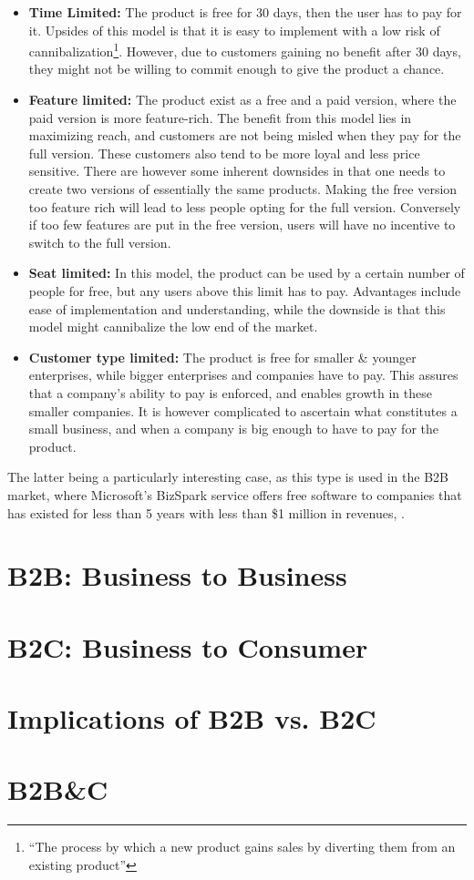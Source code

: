 \begin{itemize}
\item \textbf{Time Limited: }The product is free for 30 days, then the user has to pay for it. Upsides of this model is that it is easy to implement with a low risk of cannibalization\footnote{ “The process by which a new product
gains sales by diverting them from an existing product”\cite{heskettj1976}}. However, due to customers gaining no benefit after 30 days, they might not be willing to commit enough to give the product a chance.
\item \textbf{Feature limited: }The product exist as a free and a paid version, where the paid version is more feature-rich. The benefit from this model lies in maximizing reach, and customers are not being misled when they pay for the full version. These customers also tend to be more loyal and less price sensitive. There are however some inherent downsides in that one needs to create two versions of essentially the same products. Making the free version too feature rich will lead to less people opting for the full version. Conversely if too few features are put in the free version, users will have no incentive to switch to the full version.
\item \textbf{Seat limited: }In this model, the product can be used by a certain number of people for free, but any users above this limit has to pay. Advantages include ease of implementation and understanding, while the downside is that this model might cannibalize the low end of the market.
\item \textbf{Customer type limited: }The product is free for smaller \& younger enterprises, while bigger enterprises and companies have to pay. This assures that a company's ability to pay is enforced, and enables growth in these smaller companies. It is however complicated to ascertain what constitutes a small business, and when a company is big enough to have to pay for the product. 
\end{itemize}
The latter being a particularly interesting case, as this type is used in the B2B market, where Microsoft's BizSpark service offers free software to companies that has existed for less than 5 years with less than \$1 million in revenues, \cite{microsoft2015}.

\section{B2B: Business to Business}
\section{B2C: Business to Consumer}
\section{Implications of B2B vs. B2C}
\section{B2B\&C}

